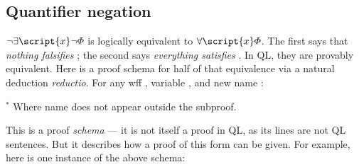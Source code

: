 \begin{ndproof}
	\open
		 
	\close
\end{ndproof}

\subsection{Quantifier negation}

$\enot\exists \script{x}\enot\metaA{}$ is logically equivalent to $\forall \script{x}\metaA{}$. The first says that \emph{nothing falsifies} \metaA{}; the second says \emph{everything satisfies} \metaA{}. In QL, they are provably equivalent. Here is a proof schema for half of that equivalence via a natural deduction \emph{reductio}. For any wff \metaA{}, variable , and new name :


\begin{ndproof}
	 
	\open
		\open
			\open
			\close
		\close
		\close
\end{ndproof}
$^\ast$ Where name  does not appear outside the subproof.

This is a proof \emph{schema} --- it is not itself a proof in QL, as its lines are not QL sentences. But it describes how a proof of this form can be given. For example, here is one instance of the above schema:


\begin{ndproof}
	 
	\open
		\open
			\open
			\close
		\close
	\close
\end{ndproof}

